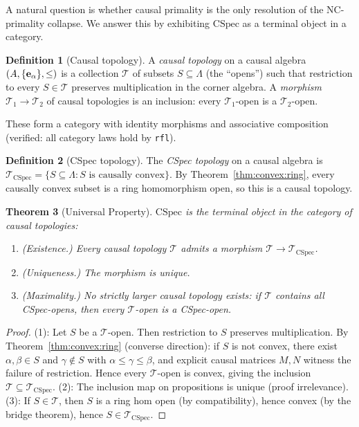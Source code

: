 \documentclass[11pt,a4paper]{article}
\theoremstyle{plain}
\newtheorem{theorem}{Theorem}[section]
\theoremstyle{definition}
\newtheorem{definition}[theorem]{Definition}
\theoremstyle{remark}
\newcommand{\CSpec}{\mathrm{CSpec}}
\begin{document}
A natural question is whether causal primality is the only resolution of the NC-primality collapse.
We answer this by exhibiting $\CSpec$ as a terminal object in a category.

\begin{definition}[Causal topology]
A \emph{causal topology} on a causal algebra $(A, \{{\bf e}_\alpha\}, \leq)$ is a collection $\mathcal{T}$ of subsets $S \subseteq \Lambda$ (the ``opens'') such that restriction to every $S \in \mathcal{T}$ preserves multiplication in the corner algebra.
A \emph{morphism} $\mathcal{T}_1 \to \mathcal{T}_2$ of causal topologies is an inclusion: every $\mathcal{T}_1$-open is a $\mathcal{T}_2$-open.
\end{definition}

These form a category with identity morphisms and associative composition (verified: all category laws hold by \texttt{rfl}).

\begin{definition}[CSpec topology]
The \emph{CSpec topology} on a causal algebra is $\mathcal{T}_{\CSpec} = \{S \subseteq \Lambda : S \text{ is causally convex}\}$.
By Theorem~\ref{thm:convex:ring}, every causally convex subset is a ring homomorphism open, so this is a causal topology.
\end{definition}

\begin{theorem}[Universal Property]\label{thm:uniqueness}
$\CSpec$ is the terminal object in the category of causal topologies:
\begin{enumerate}[nosep]
\item \textup{(Existence.)} Every causal topology $\mathcal{T}$ admits a morphism $\mathcal{T} \to \mathcal{T}_{\CSpec}$.
\item \textup{(Uniqueness.)} The morphism is unique.
\item \textup{(Maximality.)} No strictly larger causal topology exists: if $\mathcal{T}$ contains all CSpec-opens, then every $\mathcal{T}$-open is a CSpec-open.
\end{enumerate}
\end{theorem}

\begin{proof}
(1): Let $S$ be a $\mathcal{T}$-open. Then restriction to $S$ preserves multiplication. By Theorem~\ref{thm:convex:ring} (converse direction): if $S$ is not convex, there exist $\alpha, \beta \in S$ and $\gamma \notin S$ with $\alpha \leq \gamma \leq \beta$, and explicit causal matrices $M, N$ witness the failure of restriction. Hence every $\mathcal{T}$-open is convex, giving the inclusion $\mathcal{T} \subseteq \mathcal{T}_{\CSpec}$.
(2): The inclusion map on propositions is unique (proof irrelevance).
(3): If $S \in \mathcal{T}$, then $S$ is a ring hom open (by compatibility), hence convex (by the bridge theorem), hence $S \in \mathcal{T}_{\CSpec}$.
\end{proof}
\end{document}
